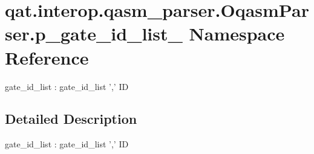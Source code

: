 \hypertarget{namespaceqat_1_1interop_1_1qasm__parser_1_1OqasmParser_1_1p__gate__id__list__1}{\section{qat.\-interop.\-qasm\-\_\-parser.\-Oqasm\-Parser.\-p\-\_\-gate\-\_\-id\-\_\-list\-\_ Namespace Reference}
\label{namespaceqat_1_1interop_1_1qasm__parser_1_1OqasmParser_1_1p__gate__id__list__1}
}


gate\-\_\-id\-\_\-list \-: gate\-\_\-id\-\_\-list ',' I\-D  




\subsection{Detailed Description}
gate\-\_\-id\-\_\-list \-: gate\-\_\-id\-\_\-list ',' I\-D 